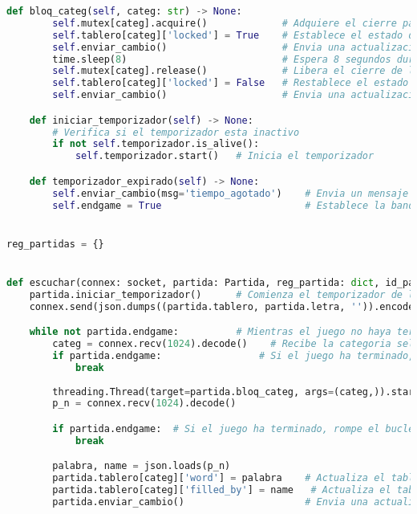 \documentclass{article}
\begin{document}
\begin{lstlisting}[language=Python, caption={Código Python}, label={lst:python_code.}]
    def bloq_categ(self, categ: str) -> None:
        self.mutex[categ].acquire()             # Adquiere el cierre para la categoria especificada
        self.tablero[categ]['locked'] = True    # Establece el estado de bloqueo de la categoria en True
        self.enviar_cambio()                    # Envia una actualizacion a todos los jugadores
        time.sleep(8)                           # Espera 8 segundos durante el tiempo de bloqueo
        self.mutex[categ].release()             # Libera el cierre de la categoria
        self.tablero[categ]['locked'] = False   # Restablece el estado de bloqueo de la categoria en False
        self.enviar_cambio()                    # Envia una actualizacion a todos los jugadores

    def iniciar_temporizador(self) -> None:
        # Verifica si el temporizador esta inactivo
        if not self.temporizador.is_alive():
            self.temporizador.start()   # Inicia el temporizador

    def temporizador_expirado(self) -> None:
        self.enviar_cambio(msg='tiempo_agotado')    # Envia un mensaje de tiempo agotado a todos los jugadores
        self.endgame = True                         # Establece la bandera de fin de juego en True


reg_partidas = {}


def escuchar(connex: socket, partida: Partida, reg_partida: dict, id_partida: str) -> None:
    partida.iniciar_temporizador()      # Comienza el temporizador de la partida
    connex.send(json.dumps((partida.tablero, partida.letra, '')).encode())    # Envia los datos iniciales del tablero y la letra al jugador recien conectado

    while not partida.endgame:          # Mientras el juego no haya terminado
        categ = connex.recv(1024).decode()    # Recibe la categoria seleccionada por el jugador
        if partida.endgame:                 # Si el juego ha terminado, rompe el bucle
            break
        
        threading.Thread(target=partida.bloq_categ, args=(categ,)).start()  # Inicia un hilo para bloquear la categoria seleccionada por el jugador
        p_n = connex.recv(1024).decode()                                      # Recibe la palabra y el nombre del jugador que la eligio

        if partida.endgame:  # Si el juego ha terminado, rompe el bucle
            break

        palabra, name = json.loads(p_n)
        partida.tablero[categ]['word'] = palabra    # Actualiza el tablero con la palabra
        partida.tablero[categ]['filled_by'] = name   # Actualiza el tablero con el nombre del jugador
        partida.enviar_cambio()                     # Envia una actualizacion del tablero a todos los jugadores


\end{lstlisting}
\end{document}
